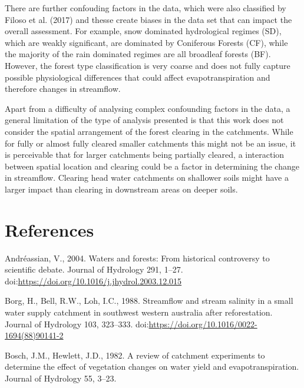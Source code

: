 \documentclass[]{elsarticle} %
\begin{document}
There are further confouding factors in the data, which were also
classified by Filoso et al. (2017) and thesse create biases in the data
set that can impact the overall assessment. For example, snow dominated
hydrological regimes (SD), which are weakly significant, are dominated
by Coniferous Forests (CF), while the majority of the rain dominated
regimes are all broadleaf forests (BF). However, the forest type
classification is very coarse and does not fully capture possible
physiological differences that could affect evapotranspiration and
therefore changes in streamflow.

Apart from a difficulty of analysing complex confounding factors in the
data, a general limitation of the type of analysis presented is that
this work does not consider the spatial arrangement of the forest
clearing in the catchments. While for fully or almost fully cleared
smaller catchments this might not be an issue, it is perceivable that
for larger catchments being partially cleared, a interaction between
spatial location and clearing could be a factor in determining the
change in streamflow. Clearing head water catchments on shallower soils
might have a larger impact than clearing in downstream areas on deeper
soils.

\hypertarget{references}{%
\section*{References}\label{references}}

\hypertarget{refs}{}
\leavevmode\hypertarget{ref-andreassian2004}{}%
Andréassian, V., 2004. Waters and forests: From historical controversy
to scientific debate. Journal of Hydrology 291, 1--27.
doi:\href{https://doi.org/https://doi.org/10.1016/j.jhydrol.2003.12.015}{https://doi.org/10.1016/j.jhydrol.2003.12.015}

\leavevmode\hypertarget{ref-borg1988}{}%
Borg, H., Bell, R.W., Loh, I.C., 1988. Streamflow and stream salinity in
a small water supply catchment in southwest western australia after
reforestation. Journal of Hydrology 103, 323--333.
doi:\href{https://doi.org/https://doi.org/10.1016/0022-1694(88)90141-2}{https://doi.org/10.1016/0022-1694(88)90141-2}

\leavevmode\hypertarget{ref-hewlett1984}{}%
Bosch, J.M., Hewlett, J.D., 1982. A review of catchment experiments to
determine the effect of vegetation changes on water yield and
evapotranspiration. Journal of Hydrology 55, 3--23.
\end{document}
